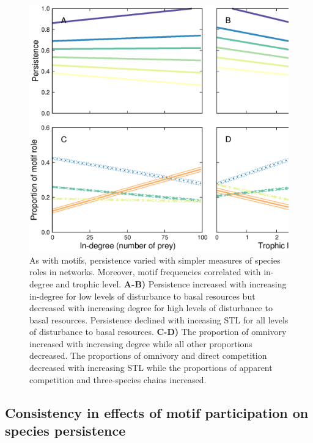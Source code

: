 \documentclass[12pt]{article}
\begin{document}
\begin{spacing}{2.0}
            \begin{figure}
                \centering
                \includegraphics[width=\textwidth]{figures/roles_vs_TL.eps}
                \caption{As with motifs, persistence varied with simpler measures of species roles in networks. Moreover, motif frequencies correlated with in-degree and trophic level. \textbf{A-B)} Persistence increased with increasing in-degree for low levels of disturbance to basal resources but decreased with increasing degree for high levels of disturbance to basal resources.
                Persistence declined with inceasing STL for all levels of disturbance to basal resources.
                \textbf{C-D)} The proportion of omnivory increased with increasing degree while all other proportions decreased. The proportions of omnivory and direct competition decreased with increasing STL while the proportions of apparent competition and three-species chains increased.}
                \label{fig:motifs_vs_TL_and_deg}
            \end{figure}        
        
    \subsection*{Consistency in effects of motif participation on species persistence}

        

\end{spacing}
\end{document}

